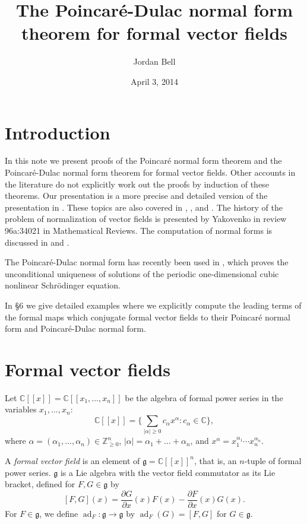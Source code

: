 \documentclass{article}
\theoremstyle{definition}
\newcommand{\ad}{\operatorname{ad}}
\begin{document}
\title{The Poincar\'e-Dulac normal form theorem for formal vector fields}
\author{Jordan Bell}

\date{April 3, 2014}       
\maketitle       


\section{Introduction}
In this note we present proofs of the Poincar\'e normal form theorem and the Poincar\'e-Dulac normal form theorem for
formal vector fields. Other accounts in the literature do not explicitly work out the proofs by induction of these theorems. 
Our presentation is a more precise and detailed version of the presentation in \cite[\S \S 3--5]{analytic}. These topics are also covered in \cite[\S I.3]{encyclopedia}, \cite[Chapter 5]{arnold1988}, and \cite[\S A.5]{poisson}.
The history of the problem
of normalization of vector fields is presented by Yakovenko in review 96a:34021 in Mathematical Reviews. The computation of normal forms is discussed in \cite{scheurle} and \cite[Chapter 19]{wiggins}.

The Poincar\'e-Dulac normal form has recently been used in \cite{unconditional}, which proves the
unconditional uniqueness of solutions of the periodic one-dimensional cubic nonlinear Schr\"odinger equation.

In \S 6 we give detailed examples where we explicitly compute the leading terms of the formal maps which conjugate formal
vector fields to their Poincar\'e normal form and Poincar\'e-Dulac normal form.

\section{Formal vector fields}
Let $\mathbb{C}[[x]]=\mathbb{C}[[x_1,\ldots,x_n]]$ be the algebra of  formal power series in the variables $x_1,\ldots,x_n$: 
\[
\mathbb{C}[[x]]=\bigg \{\sum_{|\alpha| \geq 0} c_\alpha x^\alpha : c_\alpha \in \mathbb{C} \bigg\},
\]
where $\alpha=(\alpha_1,\ldots,\alpha_n) \in \mathbb{Z}^n_{\geq 0}$, $|\alpha|=\alpha_1 + \ldots +\alpha_n$, and
$x^\alpha=x_1^{\alpha_1} \cdots x_n^{\alpha_n}$.

A {\em formal vector field} is an element of $\mathfrak{g}=\mathbb{C}[[x]]^n$, that is, an $n$-tuple of formal power series.
$\mathfrak{g}$ is a Lie algebra with the vector field commutator as its Lie bracket, defined for $F,G \in \mathfrak{g}$ by
\[
[F,G](x)=\frac{\partial G}{\partial x}(x) F(x)-\frac{\partial F}{\partial x}(x) G(x).
\]
For $F \in \mathfrak{g}$, we define $\ad_F:\mathfrak{g} \to \mathfrak{g}$ by $\ad_F(G)=[F,G]$ for $G \in \mathfrak{g}$. 
\end{document}

